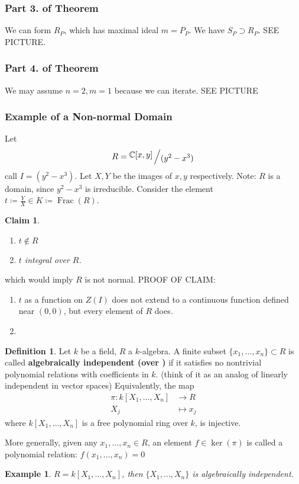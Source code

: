 \documentclass[12pt]{article}
\newcommand{\cx}{\mathbb{C}}
\DeclareMathOperator{\Frac}{Frac}
\newcommand{\bigslant}[2]{{\raisebox{.2em}{$#1$}\left/\raisebox{-.2em}{$#2$}\right.}}
\newcommand{\mapping}[5]{\begin{align*}
#1\colon #2 &\to #3\\
#4 & \mapsto #5
\end{align*}}
\newtheorem*{claim}{Claim}
\newtheorem*{eg}{Example}
\theoremstyle{definition}
\newtheorem{definition}[theorem]{Definition}
\begin{document}
\subsubsection*{Part 3. of Theorem}
We can form $R_P$, which has maximal ideal $m=P_P$. We have $S_P\supset R_P$. SEE PICTURE.

\subsubsection*{Part 4. of Theorem}
We may assume $n=2, m=1$ because we can iterate. SEE PICTURE

\subsubsection*{Example of a Non-normal Domain}
Let 
\[
R = \bigslant{\cx[x,y]}{(y^2-x^3)}
\]
call $I = (y^2-x^3)$. Let $X,Y$ be the images of $x,y$ respectively. Note: $R$ is a domain, since $y^2-x^3$ is irreducible. Consider the element $t \coloneqq \frac{Y}{X} \in K\coloneqq \Frac(R)$.
\begin{claim}
\begin{enumerate}
    \item $t\notin R$
    \item $t$ integral over $R$.
\end{enumerate}
\end{claim}
which would imply $R$ is not normal. 
PROOF OF CLAIM: 
\begin{enumerate}
    \item $t$ as a function on $Z(I)$ does not extend to a continuous function defined near $(0,0)$, but every element of $R$ does.
    \item 
\end{enumerate}
\date{06.11.2018}
\begin{definition}
Let $k$ be a field, $R$ a $k$-algebra. A finite subset $\{x_1,\dots, x_n\} \subset R$ is called \textbf{algebraically independent (over )} if it satisfies no nontrivial polynomial relations with coefficients in $k$. (think of it as an analog of linearly independent in vector spaces) Equivalently, the map 
\[
\mapping{\pi}{k[X_1,\dots ,X_n]}{R}{X_j}{x_j}
\]
where $k[X_1,\dots ,X_n]$ is a free polynomial ring over $k$, is injective.
\end{definition}
More generally, given any $x_1,\dots,x_n \in R$, an element $f\in \ker (\pi)$ is called a polynomial relation: $f(x_1,\dots, x_n) = 0$
\begin{eg}
$R = k[X_1,\dots,X_n]$, then $\{X_1,\dots,X_n \}$ is algebraically independent.
\end{eg}
\end{document}
